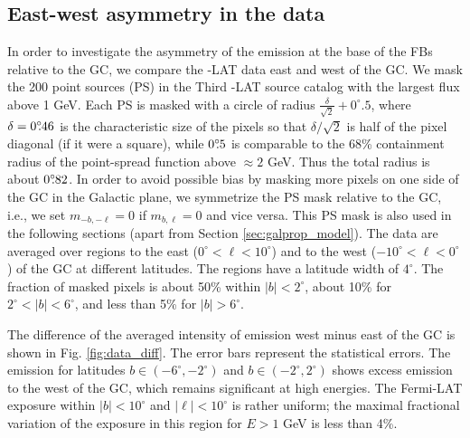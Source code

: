 \subsection{East-west  asymmetry in the data}
\label{sec:data_diff}

In order to investigate the asymmetry of the emission at the base of the FBs relative to the GC, 
we compare the \Fermi-LAT data east and west of the GC. 
We mask the 200 point sources (PS) in the Third \Fermi-LAT source catalog \citep[3FGL,][]{2015ApJS..218...23A}
with the largest flux above 1 GeV.
Each PS is masked with a circle of radius $\frac{\delta}{\sqrt{2}} + 0^\circ\!\!.5$, where $\delta = 0^\circ\!\!.46$ is the characteristic size of the pixels
so that ${\delta}/{\sqrt{2}}$ is half of the pixel diagonal (if it were a square), while $0^\circ\!\!.5$ is comparable to 
the 68\% containment radius of the point-spread function above $\approx 2$ GeV.
Thus the total radius is about $0^\circ\!\!.82$.
In order to avoid possible bias by masking more pixels on one side of the GC in the Galactic plane,
we symmetrize the PS mask relative to the GC, i.e., we set $m_{-b, -\ell} = 0$ if $m_{b, \ell} = 0$ and vice versa.
This PS mask is also used in the following sections (apart from Section \ref{sec:galprop_model}).
The data are averaged over regions to the east ($0^\circ < \ell < 10^\circ$) and to the west ($-10^\circ < \ell  <  0^\circ$) 
of the GC at different latitudes. 
The regions have a latitude width of $4^\circ$. 
The fraction of masked pixels is about 50\% within $|b| < 2^\circ$, about 10\% for $2^\circ < |b| < 6^\circ$, and less than  5\% 
for $|b| > 6^\circ$.

The difference of the averaged intensity of emission west minus east of the GC is shown in Fig. \ref{fig:data_diff}. 
The error bars represent the statistical errors.
The emission for latitudes $b \in (-6^\circ, -2^\circ)$ and $b \in (-2^\circ, 2^\circ)$ shows excess emission to the west of the GC, 
which remains significant at high energies. 
The Fermi-LAT exposure within $|b| < 10^\circ$ and $|\ell| < 10^\circ$ is rather uniform; 
the maximal fractional variation of the exposure in this region for $E > 1$ GeV is less than 4\%.

